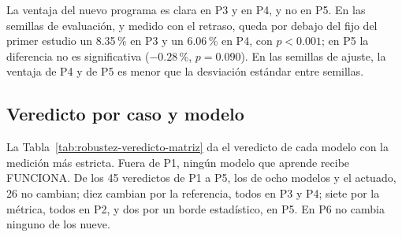 La ventaja del nuevo programa es clara en P3 y en P4, y no en P5. En las
semillas de evaluación, y medido con el retraso, queda por debajo del
fijo del primer estudio un 8.35\,\% en P3 y un 6.06\,\% en P4, con
$p < 0.001$; en P5 la diferencia no es significativa ($-0.28$\,\%,
$p = 0.090$). En las semillas de ajuste, la ventaja de P4 y de P5 es
menor que la desviación estándar entre semillas.

\subsection*{Veredicto por caso y modelo}

La Tabla~\ref{tab:robustez-veredicto-matriz} da el veredicto de cada
modelo con la medición más estricta. Fuera de P1, ningún modelo que
aprende recibe FUNCIONA. De los 45 veredictos de P1 a P5, los de ocho
modelos y el actuado, 26 no cambian; diez cambian por la referencia,
todos en P3 y P4; siete por la métrica, todos en P2, y dos por un borde
estadístico, en P5. En P6 no cambia ninguno de los nueve.


